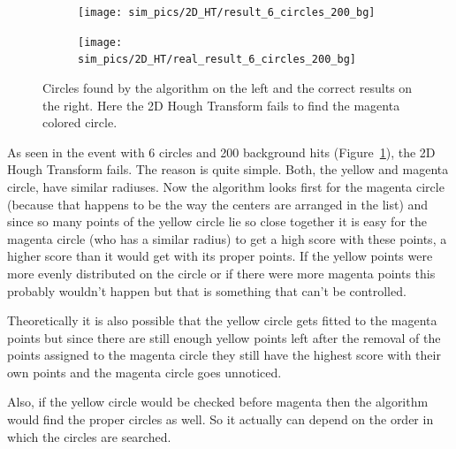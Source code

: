 \documentclass[11pt,twoside]{scrreprt}
\begin{document}
\begin{figure}[htp]
        \begin{subfigure}{0.47\textwidth}
          \centering
          \texttt{[image: sim\_pics/2D\_HT/result\_6\_circles\_200\_bg]}
        \end{subfigure}
        \begin{subfigure}{0.47\textwidth}
          \centering
          \texttt{[image: sim\_pics/2D\_HT/real\_result\_6\_circles\_200\_bg]}
        \end{subfigure}
        \caption{Circles found by the algorithm on the left and the correct results on the right. Here the 2D Hough Transform fails to find the magenta colored circle.}
        \label{fig:2d_6c_200_bg}
\end{figure}
As seen in the event with 6 circles and 200 background hits (Figure~\ref{fig:2d_6c_200_bg}), the 2D Hough Transform fails. The reason is quite simple. Both, the yellow and magenta circle, have similar radiuses. Now the algorithm looks first for the magenta circle (because that happens to be the way the centers are arranged in the list) and since so many points of the yellow circle lie so close together it is easy for the magenta circle (who has a similar radius) to get a high score with these points, a higher score than it would get with its proper points. If the yellow points were more evenly distributed on the circle or if there were more magenta points this probably wouldn't happen but that is something that can't be controlled.

Theoretically it is also possible that the yellow circle gets fitted to the
magenta points but since there are still enough yellow points left after the removal of the points assigned to the magenta circle they still have the highest score with their own points and the magenta circle goes unnoticed.

Also, if the yellow circle would be checked before magenta then the algorithm
would find the proper circles as well. So it actually can depend on the order
in which the circles are searched.
\end{document}
